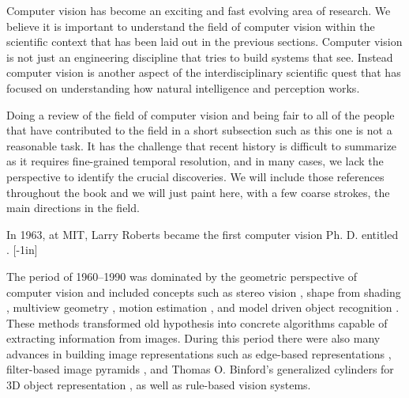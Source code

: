 
Computer vision has become an exciting and fast evolving area of research. We believe it is important to understand the field of computer vision within the scientific context that has been laid out in the previous sections. Computer vision is not just an engineering discipline that tries to build systems that see. Instead computer vision is another aspect of the interdisciplinary scientific quest that has focused on understanding how natural intelligence and perception works. 

Doing a review of the field of computer vision and being fair to all of the people that have contributed to the field in a short subsection such as this one is not a reasonable task. It has the challenge that recent history is difficult to summarize as it requires fine-grained temporal resolution, and in many cases, we lack the perspective to identify the crucial discoveries. We will include those references throughout the book and we will just paint here, with a few coarse strokes, the main directions in the field. 


In 1963, at MIT, Larry Roberts became the first computer vision Ph. D. entitled  \cite{Roberts63}.
[-1in]

The period of 1960--1990 was dominated by the geometric perspective of computer vision and included concepts such as stereo vision \cite{Longuet-Higgens1981}, shape from shading \cite{Horn89a}, multiview geometry \cite{Faugeras93,Hartley2004}, motion estimation \cite{Horn81}, and model driven object recognition \cite{Fischler1973,Mundy2006}. These methods transformed old hypothesis into concrete algorithms capable of extracting information from images. During this period there were also many advances in building image representations such as edge-based representations \cite{Canny86,Harris88,Koenderink88c,Perona90b}, filter-based image pyramids \cite{Granlund78,Burt83,Koenderink87,Malik90,Freeman91}, and Thomas O. Binford's generalized cylinders for 3D object representation \cite{binford1971}, as well as rule-based vision systems. 

